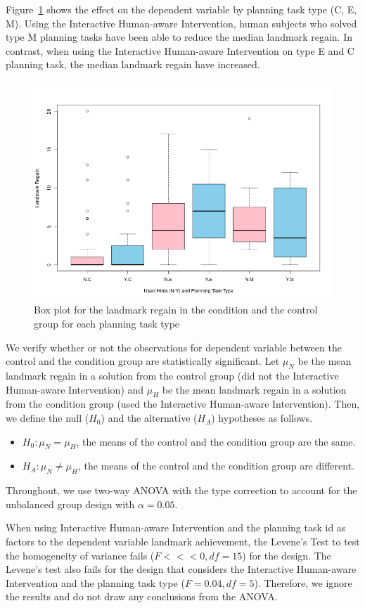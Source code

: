 Figure~\ref{fig:regainbytype} shows the effect on the dependent variable by planning task type (C, E, M).
Using the Interactive Human-aware Intervention, human subjects who solved type M planning tasks have been able to reduce the median landmark regain.
In contrast, when using the Interactive Human-aware Intervention on type E and C planning task, the median landmark regain have increased.
\begin{figure}[tpb]
  \centering
\includegraphics[width=0.7\columnwidth]{img/regainbytype.png}
  \caption{Box plot for the landmark regain in the condition and the control group for each planning task type}
  \label{fig:regainbytype}
\end{figure}

We verify whether or not the observations for dependent variable between the control and the condition group are statistically significant.
Let $\mu_N$ be the mean landmark regain in a solution from the control group (did not the Interactive Human-aware Intervention) and $\mu_H$ be the mean landmark regain in a solution from the condition group (used the Interactive Human-aware Intervention).
Then, we define the null ($H_0$) and the alternative ($H_A$) hypotheses as follows.
\begin{itemize}
\item $H_0: \mu_N = \mu_H$, the means of the control and the condition group are the same.
\item $H_A: \mu_N \neq \mu_H$, the means of the control and the condition group are different.
\end{itemize}
Throughout, we use two-way ANOVA with the type  correction to account for the unbalanced group design with $\alpha=0.05$.

When using Interactive Human-aware Intervention and the planning task id as factors to the dependent variable landmark achievement, the Levene's Test to test the homogeneity of variance fails ($F<<<0, df=15$) for the design.
The  Levene's test also fails for the design that considers the Interactive Human-aware Intervention and the planning task type ($F=0.04, df=5$).
Therefore, we ignore the results and do not draw any conclusions from the ANOVA.

